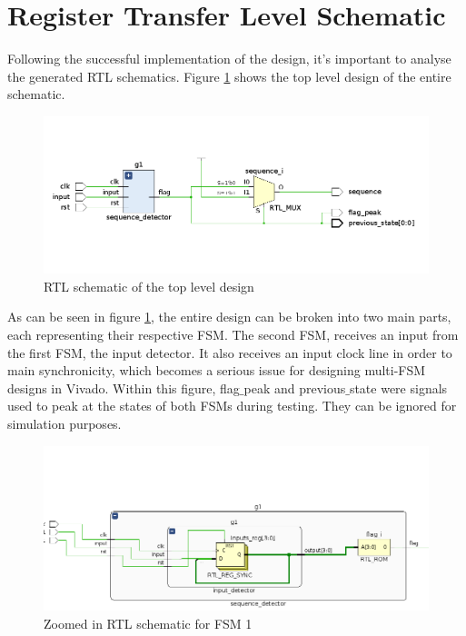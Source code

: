 \documentclass[12pt,a4paper]{article}
\begin{document}
\section{Register Transfer Level Schematic}

Following the successful implementation of the design, it's important to analyse the generated RTL schematics. Figure \ref{fig:rtl_top_level} shows the top level design of the entire schematic.

\begin{figure}[H]
    \centering
    \includegraphics[scale=0.25]{images/rtl_top_level.png}
    \caption{RTL schematic of the top level design}
    \label{fig:rtl_top_level}
\end{figure}

As can be seen in figure \ref{fig:rtl_top_level}, the entire design can be broken into two main parts, each representing their respective FSM. The second FSM, receives an input from the first FSM, the input detector. It also receives an input clock line in order to main synchronicity, which becomes a serious issue for designing multi-FSM designs in Vivado. Within this figure, flag$\_$peak and previous$\_$state were signals used to peak at the states of both FSMs during testing. They can be ignored for simulation purposes. 

\begin{figure}[H]
    \centering
    \includegraphics[scale=0.25]{images/rtl_fsm_1.png}
    \caption{Zoomed in RTL schematic for FSM 1}
    \label{fig:rtl_fsm_1}
\end{figure}
\end{document}
